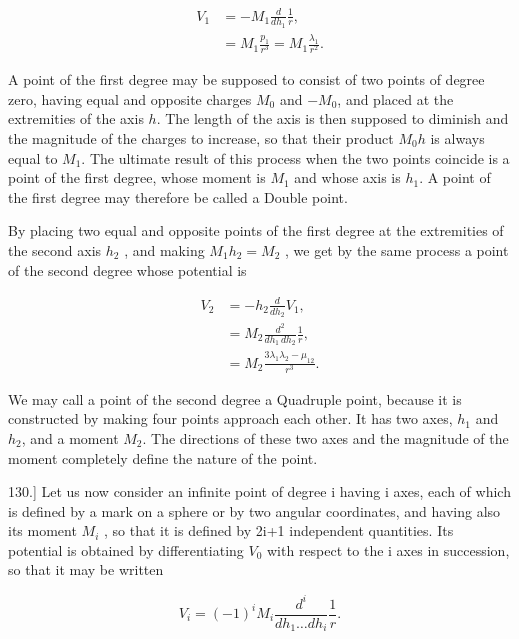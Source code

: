 \documentclass[11pt,a4paper]{article}
\begin{document}
\begin{equation}\tag{11}
\begin{split}
V_1&=-M_1\frac{d}{dh_1}\frac{1}{r},\\
&=M_1\frac{p_1}{r^3}=M_1\frac{\lambda_1}{r^2}.
\end{split}
\end{equation}

A point of the first degree may be supposed to consist of two points of degree zero, having equal and opposite charges $M_0$ and $-M_0$, and placed at the extremities of the axis $h$. The length of the axis is then supposed to diminish and the magnitude of the charges to increase, so that their product $M_0h$ is always equal to $M_1$. The ultimate result of this process when the two points coincide is a point of the first degree, whose moment is $M_1$ and whose axis is $h_1$. A point of the first degree may therefore be called a Double point.

By placing two equal and opposite points of the first degree at the extremities of the second axis  $h_2$ , and making  $M_1h_2 = M_2$ , we get by the same process a point of the second degree whose potential is

\begin{equation}\tag{12}
\begin{split}
V_2&=-h_2\frac{d}{dh_2}V_1,\\
&=M_2\frac{d^2}{dh_1\,dh_2}\frac{1}{r},\\
&=M_2\frac{3\lambda_1\lambda_2-\mu_{12}}{r^3}.
\end{split}
\end{equation}

We may call a point of the second degree a Quadruple point, because it is constructed by making four points approach each other. It has two axes, $h_1$ and $h_2$, and a moment $M_2$. The directions of these two axes and the magnitude of the moment completely define the nature of the point.

130.] Let us now consider an infinite point of degree i having i axes, each of which is defined by a mark on a sphere or by two angular coordinates, and having also its moment  $M_i$ , so that it is defined by 2i+1 independent quantities. Its potential is obtained by differentiating  $V_0$  with respect to the i axes in succession, so that it may be written

\begin{equation}\tag{13}
V_i=(-1)^iM_i\frac{d^i}{dh_1\ldots dh_i}\frac{1}{r}.
\end{equation}
\end{document}
